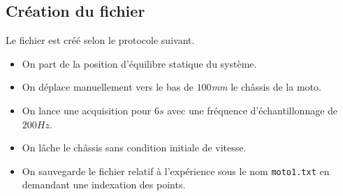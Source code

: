 \subsection{Création du fichier}%
Le fichier est créé selon le protocole suivant.
\begin{itemize}
\item On part de la position d'équilibre statique du système.
\item On déplace manuellement vers le bas de $100${\small \it mm} le châssis de la moto.
\item On lance une acquisition pour $6s$ avec une fréquence d'échantillonnage de $200Hz$.
\item On lâche le châssis sans condition initiale de vitesse.
\item On sauvegarde le fichier relatif à l'expérience sous le nom \texttt{moto1.txt} en demandant une indexation des points.
\end{itemize}
